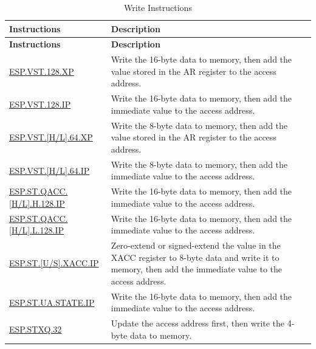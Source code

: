 \begin{longtable}[c]{|l|m{11cm}|}
    \caption{Write Instructions}
    \label{tab:pie-store-instructions}\\
    \hline
    \rowcolor{lightgray}
        \textbf{Instructions} & \textbf{Description} \\\hline
    \endfirsthead
    \rowcolor{lightgray}
    \textbf{Instructions} & \textbf{Description} \\\hline
    \endhead
    \endfoot
    
    \hyperref[instruction:ESPVST128XP]{ESP.VST.128.XP} & Write the 16-byte data to memory, then add the value stored in the AR register to the access address.
    \\\hline
    \hyperref[instruction:ESPVST128IP]{ESP.VST.128.IP} & Write the 16-byte data to memory, then add the immediate value to the access address.
    \\\hline
    \hyperref[instruction:ESPVSTH64XP]{ESP.VST.[H/L].64.XP} & Write the 8-byte data to memory, then add the value stored in the AR register to the access address.
    \\\hline
    \hyperref[instruction:ESPVSTH64IP]{ESP.VST.[H/L].64.IP} & Write the 8-byte data to memory, then add the immediate value to the access address.
    \\\hline
    \hyperref[instruction:ESPSTQACC_HH128IP]{ESP.ST.QACC.[H/L].H.128.IP} & Write the 16-byte data to memory, then add the immediate value to the access address.
    \\\hline
    \hyperref[instruction:ESPSTQACC_HL128IP]{ESP.ST.QACC.[H/L].L.128.IP} & Write the 16-byte data to memory, then add the immediate value to the access address.
    \\\hline
    \hyperref[instruction:ESPSTUXACCIP]{ESP.ST.[U/S].XACC.IP} & Zero-extend or signed-extend the value in the XACC register to 8-byte data and write it to memory, then add the immediate value to the access address.
    \\\hline
    \hyperref[instruction:ESPSTUA_STATEIP]{ESP.ST.UA.STATE.IP} & Write the 16-byte data to memory, then add the immediate value to the access address.
    \\\hline
    \hyperref[instruction:ESPSTXQ32]{ESP.STXQ.32} & Update the access address first, then write the 4-byte data to memory.
    \\\hline
\end{longtable}
